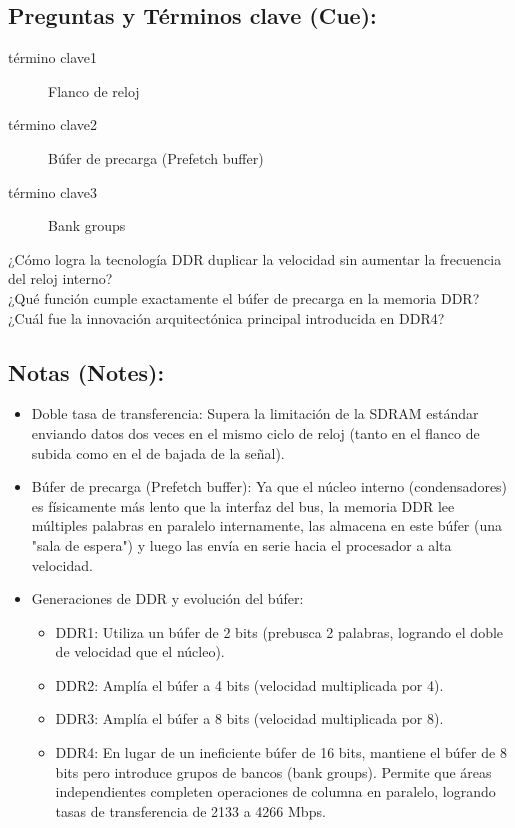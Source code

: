 \documentclass{article}
\begin{document}
\subsection{Preguntas y Términos clave (Cue):}
\label{sec:orgc08fc2e}
\begin{description}
\item[{término clave1}] Flanco de reloj
\item[{término clave2}] Búfer de precarga (Prefetch buffer)
\item[{término clave3}] Bank groups
\item[{¿Cómo logra la tecnología DDR duplicar la velocidad sin aumentar la frecuencia del reloj interno?}] 

\item[{¿Qué función cumple exactamente el búfer de precarga en la memoria DDR?}] 

\item[{¿Cuál fue la innovación arquitectónica principal introducida en DDR4?}] 
\end{description}

\subsection{Notas (Notes):}
\label{sec:org2f0dde1}
\begin{itemize}
\item Doble tasa de transferencia: Supera la limitación de la SDRAM estándar
enviando datos dos veces en el mismo ciclo de reloj (tanto en el 
flanco de subida como en el de bajada de la señal).
\item Búfer de precarga (Prefetch buffer): Ya que el núcleo interno 
(condensadores) es físicamente más lento que la interfaz del bus, la
memoria DDR lee múltiples palabras en paralelo internamente, las 
almacena en este búfer (una "sala de espera") y luego las envía en 
serie hacia el procesador a alta velocidad.
\item Generaciones de DDR y evolución del búfer:
\begin{itemize}
\item DDR1: Utiliza un búfer de 2 bits (prebusca 2 palabras, logrando el
doble de velocidad que el núcleo).
\item DDR2: Amplía el búfer a 4 bits (velocidad multiplicada por 4).
\item DDR3: Amplía el búfer a 8 bits (velocidad multiplicada por 8).
\item DDR4: En lugar de un ineficiente búfer de 16 bits, mantiene el 
búfer de 8 bits pero introduce grupos de bancos (bank groups). 
Permite que áreas independientes completen operaciones de columna en 
paralelo, logrando tasas de transferencia de 2133 a 4266 Mbps.
\end{itemize}
\end{itemize}
\end{document}
